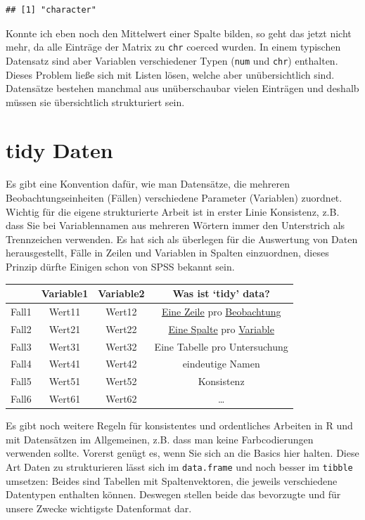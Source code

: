 \documentclass[
]{book}
\theoremstyle{definition}
\theoremstyle{definition}
\theoremstyle{definition}
\theoremstyle{definition}
\theoremstyle{remark}
\begin{document}
\begin{verbatim}
## [1] "character"
\end{verbatim}

Konnte ich eben noch den Mittelwert einer Spalte bilden, so geht das jetzt nicht mehr, da alle Einträge der Matrix zu \texttt{chr} coerced wurden. In einem typischen Datensatz sind aber Variablen verschiedener Typen (\texttt{num} und \texttt{chr}) enthalten. Dieses Problem ließe sich mit Listen lösen, welche aber unübersichtlich sind. Datensätze bestehen manchmal aus unüberschaubar vielen Einträgen und deshalb müssen sie übersichtlich strukturiert sein.

\hypertarget{tidy-daten}{%
\section{tidy Daten}\label{tidy-daten}}

Es gibt eine Konvention dafür, wie man Datensätze, die mehreren Beobachtungseinheiten (Fällen) verschiedene Parameter (Variablen) zuordnet. Wichtig für die eigene strukturierte Arbeit ist in erster Linie Konsistenz, z.B. dass Sie bei Variablennamen aus mehreren Wörtern immer den Unterstrich als Trennzeichen verwenden. Es hat sich als überlegen für die Auswertung von Daten herausgestellt, Fälle in Zeilen und Variablen in Spalten einzuordnen, dieses Prinzip dürfte Einigen
schon von SPSS bekannt sein.

\begin{longtable}[]{@{}cccc@{}}
\toprule
& Variable1 & Variable2 & Was ist `tidy' data? \\
\midrule
\endhead
Fall1 & Wert11 & Wert12 & \underline{Eine Zeile} pro \underline{Beobachtung} \\
Fall2 & Wert21 & Wert22 & \underline{Eine Spalte} pro \underline{Variable} \\
Fall3 & Wert31 & Wert32 & Eine Tabelle pro Untersuchung \\
Fall4 & Wert41 & Wert42 & eindeutige Namen \\
Fall5 & Wert51 & Wert52 & Konsistenz \\
Fall6 & Wert61 & Wert62 & \ldots{} \\
\bottomrule
\end{longtable}

Es gibt noch weitere Regeln für konsistentes und ordentliches Arbeiten in R und mit Datensätzen im Allgemeinen, z.B. dass man keine Farbcodierungen verwenden sollte. Vorerst genügt es, wenn Sie sich an die Basics hier halten. Diese Art Daten zu strukturieren lässt sich im \texttt{data.frame} und noch besser im \texttt{tibble} umsetzen: Beides sind Tabellen mit Spaltenvektoren, die jeweils verschiedene Datentypen enthalten können. Deswegen stellen beide das bevorzugte und für unsere Zwecke wichtigste Datenformat dar.
\end{document}
